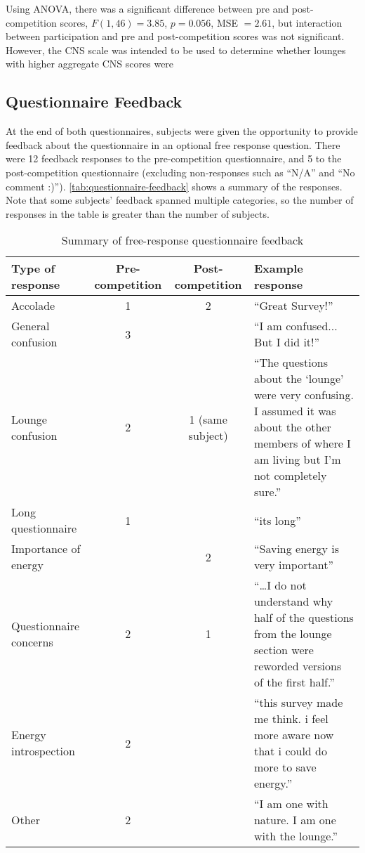 Using ANOVA, there was a significant difference between pre and post-competition scores, \(F(1, 46) = 3.85\), \(p = 0.056\), MSE \(= 2.61\), but interaction between participation and pre and post-competition scores was not significant. However, the CNS scale was intended to be used to determine whether lounges with higher aggregate CNS scores were


\subsection{Questionnaire Feedback}
\label{questionnaire-feedback}

At the end of both questionnaires, subjects were given the opportunity to provide feedback about the questionnaire in an optional free response question. There were 12 feedback responses to the pre-competition questionnaire, and 5 to the post-competition questionnaire (excluding non-responses such as ``N/A'' and ``No comment :)''). \autoref{tab:questionnaire-feedback} shows a summary of the responses. Note that some subjects' feedback spanned multiple categories, so the number of responses in the table is greater than the number of subjects.

\begin{table}[htbp]
	\centering
		\begin{tabular}{| l | c | c | p{4.5cm}|}
			\hline
			Type of response & Pre-competition & Post-competition & Example response \\ \hline \hline
			Accolade & 1 & 2 & ``Great Survey!'' \\ \hline
			General confusion & 3 & & ``I am confused... But I did it!'' \\ \hline
			Lounge confusion & 2 & 1 (same subject) & ``The questions about the `lounge' were very confusing. I assumed it was about the other members of where I am living but I'm not completely sure.'' \\ \hline
			Long questionnaire & 1 & & ``its long'' \\ \hline
			Importance of energy & & 2 & ``Saving energy is very important'' \\ \hline
			Questionnaire concerns & 2 & 1 & ``\ldots I do not understand why half of the questions from the lounge section were reworded versions of the first half.'' \\ \hline
			Energy introspection & 2 & & ``this survey made me think. i feel more aware now that i could do more to save energy.'' \\ \hline
			Other & 2 & & ``I am one with nature. I am one with the lounge.'' \\ \hline
		\end{tabular}
	\caption{Summary of free-response questionnaire feedback}
\label{tab:questionnaire-feedback}
\end{table}

